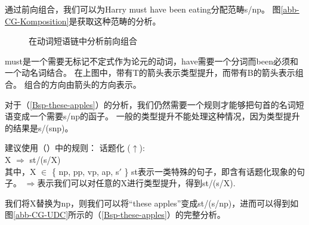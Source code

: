 通过前向组合，我们可以为Harry must have been eating分配范畴s/np。
图\vref{abb-CG-Komposition}是获取这种范畴的分析。
\begin{figure}
\centerline{%
}
\caption{\label{abb-CG-Komposition}在动词短语链中分析前向组合}
\end{figure}%
must是一个需要无标记不定式作为论元的动词，have需要一个分词而been必须和一个动名词结合。
在上图中，带有T的箭头表示类型提升，而带有B的箭头表示组合。
组合的方向由箭头的方向表示。

对于（\ref{Bsp-these-apples}）的分析，我们仍然需要一个规则才能够把句首的名词短语变成一个需要s/np的函子。
一般的类型提升不能处理这种情况，因为类型提升的结果是s/(s\bs np)。

\citet[]{Steedman89a}建议使用（）中的规则：
\ea
\label{Regel-Topikalisierung}
话题化
 ($\uparrow$\isc{$\uparrow$}\is{$\uparrow$}):\\
X $\Rightarrow$ st/(s/X)\\
其中，X $\in$ \{ np, pp, vp, ap, s$'$ \}
\z
st表示一类特殊的句子，即含有话题化现象的句子。
$\Rightarrow$表示我们可以对任意的X进行类型提升，得到st/(s/X). 

我们将X替换为np，则我们可以将“these apples”变成st/(s/np)，进而可以得到如图\vref{abb-CG-UDC}所示的（\ref{Bsp-these-apples}）的完整分析。

